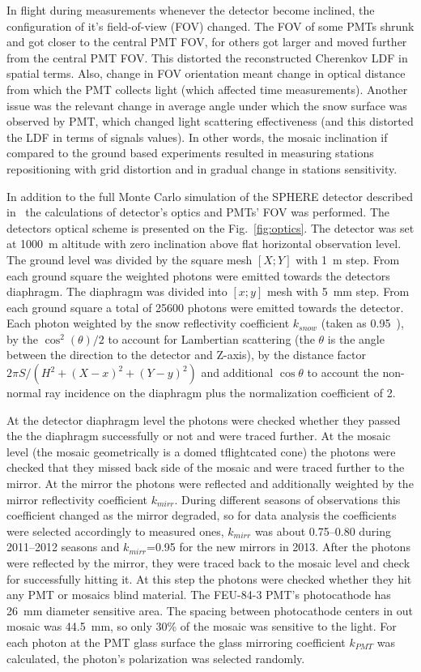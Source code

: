 \documentclass[final,5p,times,twocolumn]{elsarticle}
\begin{document}
In flight during measurements whenever the detector become inclined, the configuration of it's field-of-view (FOV) changed. The FOV of some PMTs shrunk and got closer to the central PMT FOV, for others got larger and moved further from the central PMT FOV. This distorted the reconstructed Cherenkov LDF in spatial terms. Also, change in FOV orientation meant change in optical distance from which the PMT collects light (which affected time measurements). Another issue was the relevant change in average angle under which the snow surface was observed by PMT, which changed light scattering effectiveness (and this distorted the LDF in terms of signals values). In other words, the mosaic inclination if compared to the ground based experiments resulted in measuring stations repositioning with grid distortion and in gradual change in stations sensitivity.

In addition to the full Monte Carlo simulation of the SPHERE detector described in~\cite{ant19} the calculations of detector's optics and PMTs' FOV was performed. The detectors optical scheme is presented on the Fig.~\ref{fig:optics}. The detector was set at 1000~m altitude with zero inclination above flat horizontal observation level. The ground level was divided by the square mesh $[X;Y]$ with 1~m step. From each ground square the weighted photons were emitted towards the detectors diaphragm. The diaphragm was divided into $[x;y]$ mesh with 5~mm step. From each ground square a total of 25600 photons were emitted towards the detector. Each photon weighted by the snow reflectivity coefficient $k_{snow}$ (taken as 0.95~\cite{war82}), by the $\cos^2(\theta)/2$ to account for Lambertian scattering (the $\theta$ is the angle between the direction to the detector and Z-axis), by the distance factor $2\pi{}S/(H^2+(X-x)^2+(Y-y)^2)$ and additional $\cos\theta$ to account the non-normal ray incidence on the diaphragm {\color{red}plus} the normalization coefficient of 2.

At the detector diaphragm level the photons were checked whether they passed the the diaphragm successfully or not and were traced further. At the mosaic level (the mosaic geometrically is a domed {\color{red}tflightcated} cone) the photons were checked that they missed back side of the mosaic and were traced further to the mirror. At the mirror the photons were reflected and additionally weighted by the mirror reflectivity coefficient $k_{mirr}$. During different seasons of observations this coefficient changed as the mirror degraded, so for data analysis the coefficients were selected accordingly to {\color{red} measured ones}, $k_{mirr}$ was about 0.75--0.80 during 2011--2012 seasons and $k_{mirr}$=0.95 for the new mirrors in 2013. After the photons were reflected by the mirror, they were traced back to the mosaic level and check for successfully hitting it. At this step the photons were checked whether they hit any PMT or mosaics blind material. The \mbox{FEU-84-3} PMT's photocathode has 26~mm diameter sensitive area. The spacing between photocathode centers in out mosaic was 44.5~mm, so only 30\% of the mosaic was sensitive to the light. For each photon at the PMT glass surface the glass mirroring coefficient $k_{PMT}$ was calculated, the photon's polarization was selected randomly.
\end{document}
